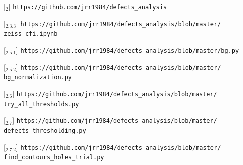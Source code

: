 \singlespacing
{}
\label{chap:gitrefs}



[\href{https://github.com/jrr1984/defects\_analysis}{\faGithub$_{2}$}] \texttt{https://github.com/jrr1984/defects\_analysis}

[\href{https://github.com/jrr1984/defects\_analysis/blob/master/zeiss\_cfi.ipynb}{\faGithub$_{2.3.3}$}] \texttt{https://github.com/jrr1984/defects\_analysis/blob/master/\\\hspace{1.5cm}zeiss\_cfi.ipynb}

[\href{https://github.com/jrr1984/defects\_analysis/blob/master/bg.py}{\faGithub$_{2.5.1}$}] \texttt{https://github.com/jrr1984/defects\_analysis/blob/master/bg.py}

[\href{https://github.com/jrr1984/defects\_analysis/blob/master/bg\_normalization.py}{\faGithub$_{2.5.2}$}] \texttt{https://github.com/jrr1984/defects\_analysis/blob/master/\\\hspace{1.5cm}bg\_normalization.py}

[\href{https://github.com/jrr1984/defects\_analysis/blob/master/try\_all\_thresholds.py}{\faGithub$_{2.6}$}] \texttt{https://github.com/jrr1984/defects\_analysis/blob/master/\\\hspace{1.5cm}try\_all\_thresholds.py}

[\href{https://github.com/jrr1984/defects\_analysis/blob/master/defects\_thresholding.py}{\faGithub$_{2.7}$}] \texttt{https://github.com/jrr1984/defects\_analysis/blob/master/\\\hspace{1.5cm}defects\_thresholding.py}

[\href{https://github.com/jrr1984/defects\_analysis/blob/master/find\_contours\_holes\_trial.py}{\faGithub$_{2.7.2}$}] \texttt{https://github.com/jrr1984/defects\_analysis/blob/master/\\\hspace{1.5cm}find\_contours\_holes\_trial.py}

